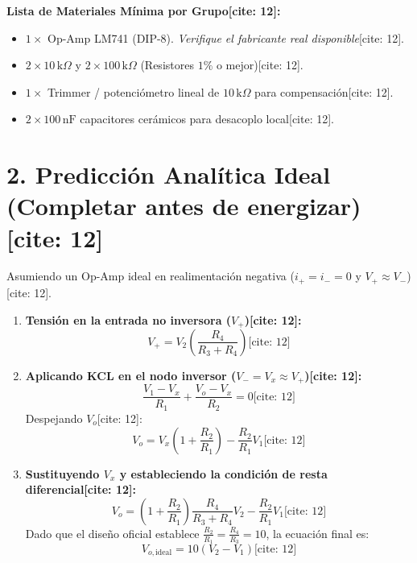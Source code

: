 \documentclass[11pt, a4paper]{article}
\begin{document}
\textbf{Lista de Materiales Mínima por Grupo[cite: 12]:}
\begin{itemize}
    \item $1\times$ Op-Amp LM741 (DIP-8). \textit{Verifique el fabricante real disponible}[cite: 12].
    \item $2\times 10\,\text{k}\Omega$ y $2\times 100\,\text{k}\Omega$ (Resistores $1\%$ o mejor)[cite: 12].
    \item $1\times$ Trimmer / potenciómetro lineal de $10\,\text{k}\Omega$ para compensación[cite: 12].
    \item $2\times 100\,\text{nF}$ capacitores cerámicos para desacoplo local[cite: 12].
\end{itemize}

\section*{2. Predicción Analítica Ideal (Completar antes de energizar)[cite: 12]}
Asumiendo un Op-Amp ideal en realimentación negativa ($i_+ = i_- = 0$ y $V_+ \approx V_-$)[cite: 12].
\begin{enumerate}
    \item \textbf{Tensión en la entrada no inversora ($V_+$)[cite: 12]:}
    \begin{equation*}
        V_+ = V_2\left(\frac{R_4}{R_3 + R_4}\right) \text{[cite: 12]}
    \end{equation*}
    
    \item \textbf{Aplicando KCL en el nodo inversor ($V_- = V_x \approx V_+$)[cite: 12]:}
    \begin{equation*}
        \frac{V_1 - V_x}{R_1} + \frac{V_o - V_x}{R_2} = 0 \text{[cite: 12]}
    \end{equation*}
    Despejando $V_o$[cite: 12]:
    \begin{equation*}
        V_o = V_x\left(1 + \frac{R_2}{R_1}\right) - \frac{R_2}{R_1}V_1 \text{[cite: 12]}
    \end{equation*}
    
    \item \textbf{Sustituyendo $V_x$ y estableciendo la condición de resta diferencial[cite: 12]:}
    \begin{equation*}
        V_o = \left(1 + \frac{R_2}{R_1}\right)\frac{R_4}{R_3 + R_4}V_2 - \frac{R_2}{R_1}V_1 \text{[cite: 12]}
    \end{equation*}
    Dado que el diseño oficial establece $\frac{R_2}{R_1} = \frac{R_4}{R_3} = 10$, la ecuación final es:
    \begin{equation*}
        \boxed{ V_{o,\mathrm{ideal}} = 10(V_2 - V_1) } \text{[cite: 12]}
    \end{equation*}
\end{enumerate}
\end{document}
